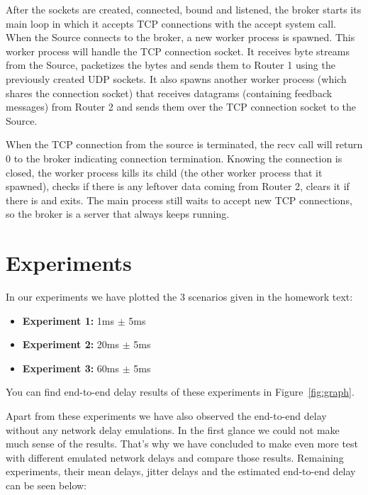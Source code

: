 \documentclass[conference]{IEEEtran}
\begin{document}
After the sockets are created, connected, bound and listened, the broker starts
its main loop in which it accepts TCP connections with the accept system call.
When the Source connects to the broker, a new worker process is spawned. This worker
process will handle the TCP connection socket. It receives byte streams from the Source,
packetizes the bytes and sends them to Router 1 using the previously
created UDP sockets. It also spawns another worker process (which shares the connection
socket) that receives datagrams (containing feedback messages) from Router 2 and
sends them over the TCP connection socket to the Source.

When the TCP connection from the source is terminated, the recv call will return 0
to the broker indicating connection termination. Knowing the connection is closed,
the worker process kills its child (the other worker process that it spawned),
checks if there is any leftover data coming from Router 2, clears it if there is
and exits. The main process still waits to accept new TCP connections, so the broker
is a server that always keeps running.

\section{Experiments}

In our experiments we have plotted the 3 scenarios given in the homework text:

\begin{itemize}
    \item \textbf{Experiment 1:} 1ms $\pm$ 5ms
    \item \textbf{Experiment 2:} 20ms $\pm$ 5ms
    \item \textbf{Experiment 3:} 60ms $\pm$ 5ms
\end{itemize}
You can find end-to-end delay results of these experiments in Figure~\ref{fig:graph}.

Apart from these experiments we have also observed the end-to-end delay without any network delay emulations. In the first glance we could not make much sense of the results. That's why we have concluded to  make even more test with different emulated network delays and compare those results. Remaining experiments, their mean delays, jitter delays and the estimated end-to-end delay can be seen below:
\end{document}
